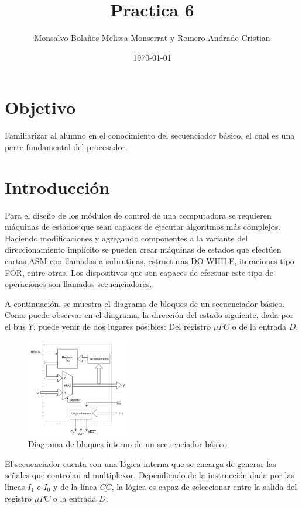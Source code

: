 \documentclass[table]{scrartcl}
\author{Monsalvo Bolaños Melissa Monserrat y Romero Andrade Cristian}
\date{\today}
\title{Practica 6}
\begin{document}

\date{}
\tableofcontents{}

\section{Objetivo}
\label{sec:objetivo}
Familiarizar al alumno en el conocimiento del secuenciador básico, el cual es
una parte fundamental del procesador.

\section{Introducción}\label{sec:introduccion}
Para el diseño de los módulos de control de una computadora se requieren máquinas de
estados que sean capaces de ejecutar algoritmos más complejos. Haciendo modificaciones
y agregando componentes a la variante del direccionamiento implícito se pueden crear
máquinas de estados que efectúen cartas ASM con llamadas a subrutinas, estructuras DO
WHILE, iteraciones tipo FOR, entre otras. Los dispositivos que son capaces de efectuar este
tipo de operaciones son llamados secuenciadores.

A continuación, se muestra el diagrama de bloques de un secuenciador básico. Como puede
observar en el diagrama, la dirección del estado siguiente, dada por el bus $Y$, puede venir de
dos lugares posibles: Del registro $\mu{}PC$ o de la entrada $D$.
\begin{figure}[H]
  \centering
  \includegraphics[width=0.4\textwidth]{./img/1}
  \caption{Diagrama de bloques interno de un secuenciador básico}\label{fig:1}
\end{figure}

El secuenciador cuenta con una lógica interna que se encarga de generar las señales que
controlan al multiplexor. Dependiendo de la instrucción dada por las líneas $I_1$ e $I_0$ y de la línea
$\underline{CC}$, la lógica es capaz de seleccionar entre la salida del registro $\mu{}PC$ o la
entrada $D$.
\end{document}
